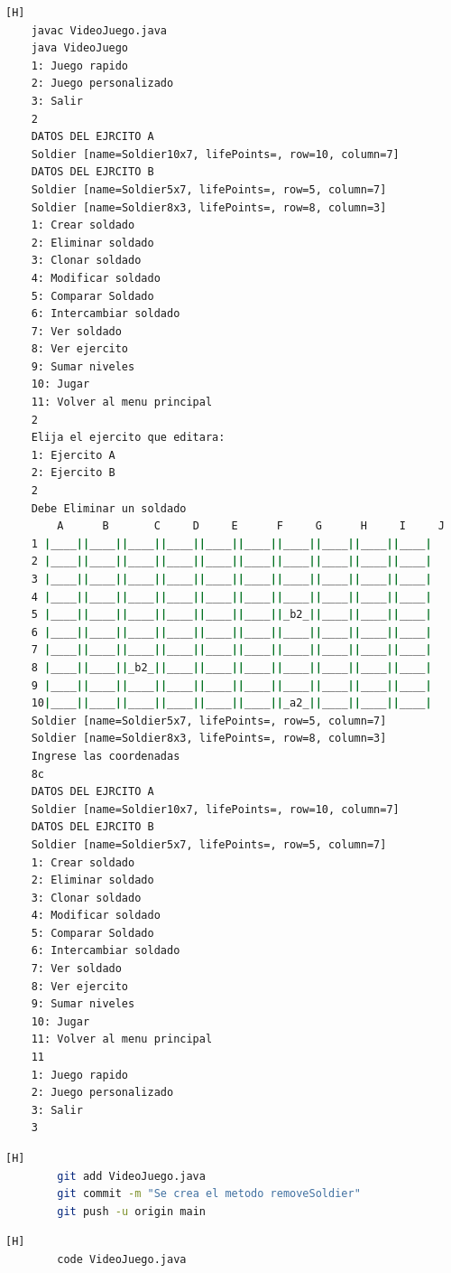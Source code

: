 \documentclass{article}
\begin{document}
	
	\begin{lstlisting}[language=bash,caption={Compilando y probando el método removeSoldier  }][H]
	javac VideoJuego.java
	java VideoJuego
	1: Juego rapido
	2: Juego personalizado
	3: Salir
	2
	DATOS DEL EJRCITO A
	Soldier [name=Soldier10x7, lifePoints=, row=10, column=7]
	DATOS DEL EJRCITO B
	Soldier [name=Soldier5x7, lifePoints=, row=5, column=7]
	Soldier [name=Soldier8x3, lifePoints=, row=8, column=3]
	1: Crear soldado
	2: Eliminar soldado
	3: Clonar soldado
	4: Modificar soldado
	5: Comparar Soldado
	6: Intercambiar soldado
	7: Ver soldado
	8: Ver ejercito
	9: Sumar niveles
	10: Jugar
	11: Volver al menu principal
	2
	Elija el ejercito que editara:
	1: Ejercito A
	2: Ejercito B
	2
	Debe Eliminar un soldado
		A      B       C     D     E      F     G      H     I     J
	1 |____||____||____||____||____||____||____||____||____||____|
	2 |____||____||____||____||____||____||____||____||____||____|
	3 |____||____||____||____||____||____||____||____||____||____|
	4 |____||____||____||____||____||____||____||____||____||____|
	5 |____||____||____||____||____||____||_b2_||____||____||____|
	6 |____||____||____||____||____||____||____||____||____||____|
	7 |____||____||____||____||____||____||____||____||____||____|
	8 |____||____||_b2_||____||____||____||____||____||____||____|
	9 |____||____||____||____||____||____||____||____||____||____|
	10|____||____||____||____||____||____||_a2_||____||____||____|
	Soldier [name=Soldier5x7, lifePoints=, row=5, column=7]
	Soldier [name=Soldier8x3, lifePoints=, row=8, column=3]
	Ingrese las coordenadas
	8c
	DATOS DEL EJRCITO A
	Soldier [name=Soldier10x7, lifePoints=, row=10, column=7]
	DATOS DEL EJRCITO B
	Soldier [name=Soldier5x7, lifePoints=, row=5, column=7]
	1: Crear soldado
	2: Eliminar soldado
	3: Clonar soldado
	4: Modificar soldado
	5: Comparar Soldado
	6: Intercambiar soldado
	7: Ver soldado
	8: Ver ejercito
	9: Sumar niveles
	10: Jugar
	11: Volver al menu principal
	11
	1: Juego rapido
	2: Juego personalizado
	3: Salir
	3
	\end{lstlisting}
	

	\begin{lstlisting}[language=bash,caption={Commit: 28886c9cee9a351810f14da8769e1c922a221904}][H]
		git add VideoJuego.java
		git commit -m "Se crea el metodo removeSoldier"			
		git push -u origin main
	\end{lstlisting}
	
	
	
	
	
	\begin{lstlisting}[language=bash,caption={Se implementa el método para clonar un soldado }][H]
		code VideoJuego.java
	\end{lstlisting}
	
\end{document}
